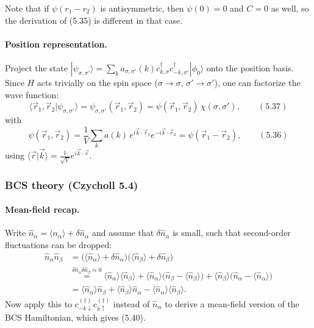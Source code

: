 \documentclass[../../main.tex]{subfiles}
\begin{document}
Note that if $\psi(r_1-r_2)$ is antisymmetric, then $\psi(0)=0$ and $C=0$ as well, so the
derivation of (5.35) is different in that case.

\paragraph{Position representation.}
Project the state
$|\psi_{\sigma,\sigma'}\rangle=\sum_k a_{\sigma,\sigma'}(k)c^\dagger_{k,\sigma}
c^\dagger_{-k,\sigma'}|\phi_0\rangle$ onto the position basis. Since $H$ acts trivially
on the spin space ($\sigma\to\sigma$, $\sigma'\to\sigma'$), one can factorize the wave
function:
\begin{equation}
\langle \vec r_1,\vec r_2|\psi_{\sigma,\sigma'}\rangle
=\psi_{\sigma,\sigma'}(\vec r_1,\vec r_2)
=\psi(\vec r_1,\vec r_2)\,\chi(\sigma,\sigma'),
\qquad (5.37)
\end{equation}
with
\begin{equation}
\psi(\vec r_1,\vec r_2)=\frac{1}{V}\sum_k a(k)\,
e^{i\vec k\cdot\vec r_1}e^{-i\vec k\cdot\vec r_2}=\psi(\vec r_1-\vec r_2),
\qquad (5.36)
\end{equation}
using $\langle\vec r|\vec k\rangle=\frac{1}{\sqrt V}e^{i\vec k\cdot\vec r}$.

\subsubsection{BCS theory (Czycholl 5.4)}
\label{subsubsec:bcs-theory_details}

\paragraph{Mean-field recap.}
Write $\hat n_\alpha=\langle n_\alpha\rangle+\delta\hat n_\alpha$ and assume that
$\delta\hat n_\alpha$ is small, such that second-order fluctuations can be dropped:
\begin{align}
\hat n_\alpha\hat n_\beta
&=\big(\langle\hat n_\alpha\rangle+\delta\hat n_\alpha\big)
  \big(\langle\hat n_\beta\rangle+\delta\hat n_\beta\big)\\
&\overset{\delta\hat n_\alpha\delta\hat n_\beta\approx0}{=}
  \langle\hat n_\alpha\rangle\langle\hat n_\beta\rangle
  +\langle\hat n_\alpha\rangle\big(\hat n_\beta-\langle\hat n_\beta\rangle\big)
  +\langle\hat n_\beta\rangle\big(\hat n_\alpha-\langle\hat n_\alpha\rangle\big)\\
&=\langle\hat n_\alpha\rangle\hat n_\beta+\langle\hat n_\beta\rangle\hat n_\alpha
  -\langle\hat n_\alpha\rangle\langle\hat n_\beta\rangle .
\end{align}
Now apply this to $c^{(\dagger)}_{-k\downarrow}c^{(\dagger)}_{k\uparrow}$ instead of
$\hat n_\alpha$ to derive a mean-field version of the BCS Hamiltonian, which gives
(5.40).
\end{document}

